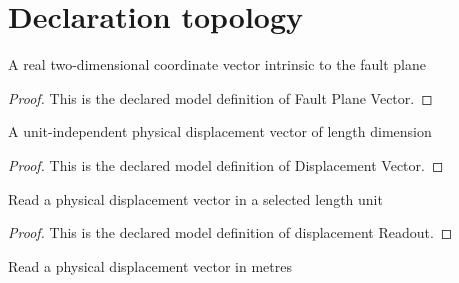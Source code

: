 \section{Declaration topology}
\begin{definition}
  \label{def:physics:phyx-mini-0735:phyxminiproblems-problemphyxmini0735-faultplanevector}
  A real two-dimensional coordinate vector intrinsic to the fault plane
\end{definition}
\begin{proof}
  This is the declared model definition of Fault Plane Vector.
\end{proof}
\begin{definition}
  \label{def:physics:phyx-mini-0735:phyxminiproblems-problemphyxmini0735-displacementvector}
  A unit-independent physical displacement vector of length dimension
\end{definition}
\begin{proof}
  This is the declared model definition of Displacement Vector.
\end{proof}
\begin{definition}
  \label{def:physics:phyx-mini-0735:phyxminiproblems-problemphyxmini0735-displacementreadout}
  Read a physical displacement vector in a selected length unit
\end{definition}
\begin{proof}
  This is the declared model definition of displacement Readout.
\end{proof}
\begin{definition}
  \label{def:physics:phyx-mini-0735:phyxminiproblems-problemphyxmini0735-displacementinmeters}
  Read a physical displacement vector in metres
\end{definition}
